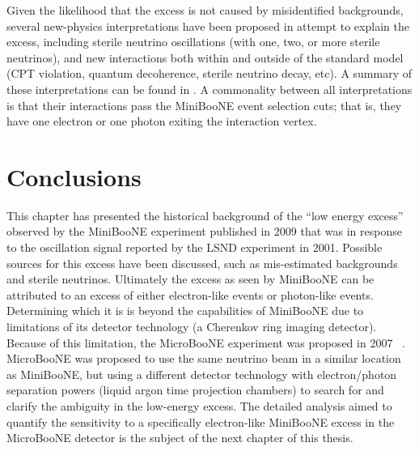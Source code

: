 Given the likelihood that the excess is not caused by misidentified backgrounds, several new-physics interpretations have been proposed in attempt to explain the excess, including sterile neutrino oscillations (with one, two, or more sterile neutrinos), and new interactions both within and outside of the standard model (CPT violation, quantum decoherence, sterile neutrino decay, etc). A summary of these interpretations can be found in \cite{MBLEESourcesOverview}. A commonality between all interpretations is that their interactions pass the MiniBooNE event selection cuts; that is, they have one electron or one photon exiting the interaction vertex.\\

\section{Conclusions}
This chapter has presented the historical background of the ``low energy excess'' observed by the MiniBooNE experiment published in 2009 that was in response to the oscillation signal reported by the LSND experiment in 2001. Possible sources for this excess have been discussed, such as mis-estimated backgrounds and sterile neutrinos. Ultimately the excess as seen by MiniBooNE can be attributed to an excess of either electron-like events or photon-like events. Determining which it is is beyond the capabilities of MiniBooNE due to limitations of its detector technology (a Cherenkov ring imaging detector). Because of this limitation, the MicroBooNE experiment was proposed in 2007 ~\cite{MicroBooNEProposal}. MicroBooNE was proposed to use the same neutrino beam in a similar location as MiniBooNE, but using a different detector technology with electron/photon separation powers (liquid argon time projection chambers) to search for and clarify the ambiguity in the low-energy excess. The detailed analysis aimed to quantify the sensitivity to a specifically electron-like MiniBooNE excess in the MicroBooNE detector is the subject of the next chapter of this thesis.
